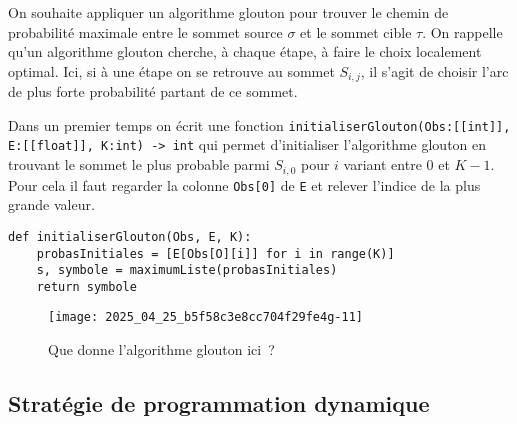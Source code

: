 On souhaite appliquer un algorithme glouton pour trouver le chemin de probabilité maximale entre le sommet source $\sigma$ et le sommet cible $\tau$. On rappelle qu'un algorithme glouton cherche, à chaque étape, à faire le choix localement optimal. Ici, si à une étape on se retrouve au sommet $S_{i, j}$, il s'agit de choisir l'arc de plus forte probabilité partant de ce sommet.

Dans un premier temps on écrit une fonction
\lstinline{initialiserGlouton(Obs:[[int]], E:[[float]], K:int) -> int} qui permet d'initialiser l'algorithme glouton en trouvant le sommet le plus probable parmi $S_{i, 0}$ pour $i$ variant entre 0 et $K-1$. Pour cela il faut regarder la colonne \lstinline{Obs[0]} de \lstinline{E} et relever l'indice de la plus grande valeur.

\begin{lstlisting}
def initialiserGlouton(Obs, E, K):
    probasInitiales = [E[Obs[O][i]] for i in range(K)]
    s, symbole = maximumListe(probasInitiales)
    return symbole
\end{lstlisting}






\begin{figure}
\centering
\texttt{[image: 2025\_04\_25\_b5f58c3e8cc704f29fe4g-11]}
\caption{Que donne l'algorithme glouton ici~? \label{fig_ccmp_2024_info_04}}
\end{figure}




\subsection{Stratégie de programmation dynamique}


